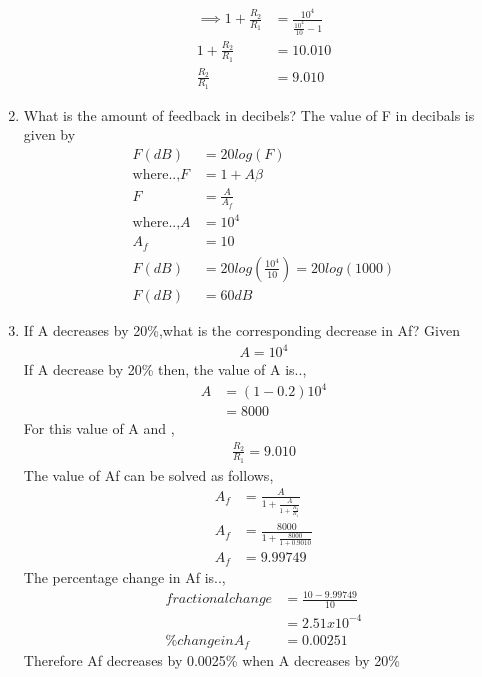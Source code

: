 \begin{enumerate}[label=\thesubsection.\arabic*.,ref=\thesubsection.\theenumi]
\begin{align}
\implies 1+\frac{R_2}{R_1} &= \frac{10^4}{\frac{10^4}{10}-1}
\\
1+\frac{R_2}{R_1} &= 10.010
\\
\frac{R_2}{R_1} &= 9.010
\end{align}
\item What is the amount of feedback in decibels?
\solution The value of F in decibals is given by 
\begin{align}
    F(dB) &= 20log(F)\\
\text{where..,} F &= 1+A\beta \\
F &= \frac{A}{A_f}\\
\text{where..,} A&=10^4 \\ A_f &= 10\\
F(dB) &= 20log(\frac{10^4}{10})=20log(1000)\\
F(dB) &= 60 dB
\end{align}
\item If A decreases by 20\%,what is the corresponding decrease in Af?
\solution Given
\begin{align}
A = 10^4
\end{align}
If A decrease by 20\% then,
the value of A is..,
\begin{align}
    A &= (1-0.2)10^4 \\
      &= 8000
\end{align}
For this value of A and ,
\begin{align}
    \frac{R_2}{R_1} = 9.010
\end{align}
The value of Af can be solved as follows,
\begin{align}
 A_f &= \frac{A}{1+\frac{A}{1+\frac{R_2}{R_1}}}\\
 A_f &= \frac{8000}{1+\frac{8000}{1+0.9010}}\\
 A_f &= 9.99749
\end{align}
The percentage change in Af is..,
\begin{align}
    fractionalchange &= \frac{10-9.99749}{10}\\
      &= 2.51x10^{-4}\\
     \% change in A_f &= 0.00251
\end{align}
Therefore Af decreases by 0.0025\% when A decreases by 20\%
\end{enumerate}

